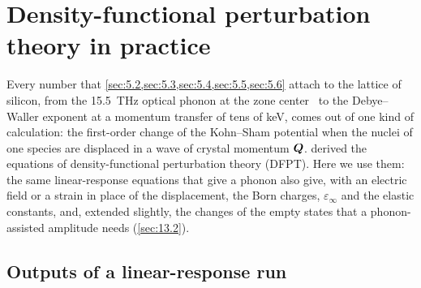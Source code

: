 \section{Density-functional perturbation theory in practice}\label{app:E.4}

Every number that \cref{sec:5.2,sec:5.3,sec:5.4,sec:5.5,sec:5.6} attach to the lattice of silicon, from the \SI{15.5}{THz} optical phonon at the zone center~\cite{nilsson1972study} to the Debye--Waller exponent at a momentum transfer of tens of keV, comes out of one kind of calculation: the first-order change of the Kohn--Sham potential when the nuclei of one species are displaced in a wave of crystal momentum $\bm{Q}$.  derived the equations of density-functional perturbation theory (DFPT). Here we use them: the same linear-response equations that give a phonon also give, with an electric field or a strain in place of the displacement, the Born charges, $\varepsilon_\infty$ and the elastic constants, and, extended slightly, the changes of the empty states that a phonon-assisted amplitude needs (\cref{sec:13.2}).

\subsection{Outputs of a linear-response run}

